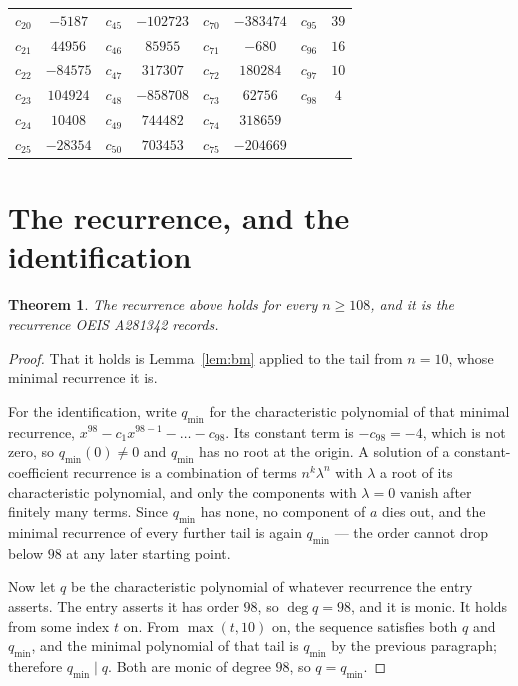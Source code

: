 \documentclass[11pt,a4paper]{article}
\theoremstyle{plain}
\newtheorem{theorem}{Theorem}
\theoremstyle{definition}
\begin{document}
\begin{center}
\begin{tabular}{cccccccc}
$c_{20}$ & $-5187$ & $c_{45}$ & $-102723$ & $c_{70}$ & $-383474$ & $c_{95}$ & $39$ \\
$c_{21}$ & $44956$ & $c_{46}$ & $85955$ & $c_{71}$ & $-680$ & $c_{96}$ & $16$ \\
$c_{22}$ & $-84575$ & $c_{47}$ & $317307$ & $c_{72}$ & $180284$ & $c_{97}$ & $10$ \\
$c_{23}$ & $104924$ & $c_{48}$ & $-858708$ & $c_{73}$ & $62756$ & $c_{98}$ & $4$ \\
$c_{24}$ & $10408$ & $c_{49}$ & $744482$ & $c_{74}$ & $318659$ &  &  \\
$c_{25}$ & $-28354$ & $c_{50}$ & $703453$ & $c_{75}$ & $-204669$ &  &  \\
\end{tabular}
\end{center}

\section{The recurrence, and the identification}

\begin{theorem}
The recurrence above holds for every $n\ge108$, and it is the recurrence OEIS A281342 records.
\end{theorem}

\begin{proof}
That it holds is Lemma~\ref{lem:bm} applied to the tail from $n=10$, whose minimal
recurrence it is.

For the identification, write $q_{\min}$ for the characteristic polynomial of that minimal
recurrence, $x^{98}-c_1x^{98-1}-\dots-c_{98}$. Its constant term is
$-c_{98}=-4$, which is not zero, so $q_{\min}(0)\neq0$ and $q_{\min}$ has no
root at the origin. A solution of a constant-coefficient recurrence is a combination of terms
$n^{k}\lambda^{n}$ with $\lambda$ a root of its characteristic polynomial, and only the
components with $\lambda=0$ vanish after finitely many terms. Since $q_{\min}$ has none, no
component of $a$ dies out, and the minimal recurrence of every further tail is again
$q_{\min}$ --- the order cannot drop below $98$ at any later starting point.

Now let $q$ be the characteristic polynomial of whatever recurrence the entry asserts. The
entry asserts it has order $98$, so $\deg q=98$, and it is monic. It holds from some
index $t$ on. From $\max(t,10)$ on, the sequence satisfies both $q$ and $q_{\min}$, and
the minimal polynomial of that tail is $q_{\min}$ by the previous paragraph; therefore
$q_{\min}\mid q$. Both are monic of degree $98$, so $q=q_{\min}$.
\end{proof}
\end{document}
